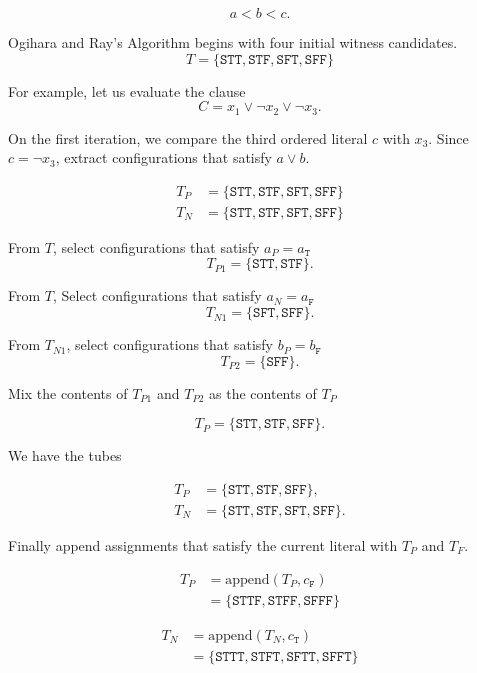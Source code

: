 \[
a < b < c.
\]


{\sc Ogihara and Ray's Algorithm} begins with four initial witness candidates. 
\[
T = \{ \texttt{STT}, \texttt{STF}, \texttt{SFT}, \texttt{SFF}\}
\]

\noindent For example, let us evaluate the clause
\[
C = x_1 \vee \neg x_2 \vee \neg x_3.
\]

\noindent On the first iteration, we compare the third ordered literal $c$ with $x_3$.  Since $c = \neg x_3$, extract configurations that satisfy $a \vee b$.  

\begin{align*}
T_P &= \{ \texttt{STT}, \texttt{STF}, \texttt{SFT}, \texttt{SFF}\} \\
T_N &= \{ \texttt{STT}, \texttt{STF}, \texttt{SFT}, \texttt{SFF}\} 
\end{align*}

\noindent From $T$, select configurations that satisfy $a_P = a_{\texttt{T}}$
\[
T_{P1} = \{ \texttt{STT}, \texttt{STF} \}.
\]

\noindent From $T$, Select configurations that satisfy $a_N = a_{\texttt{F}}$
\[
T_{N1} = \{ \texttt{SFT}, \texttt{SFF} \}.
\]

\noindent From $T_{N1}$, select configurations that satisfy $b_P = b_{\texttt{F}}$
\[
T_{P2} = \{ \texttt{SFF} \}.
\]

\noindent Mix the contents of $T_{P1}$ and $T_{P2}$ as the contents of $T_P$

\[
T_P = \{ \texttt{STT}, \texttt{STF}, \texttt{SFF} \}.
\]

\noindent We have the tubes

\begin{align*}
T_P &= \{ \texttt{STT}, \texttt{STF}, \texttt{SFF} \}, \\
T_N &= \{ \texttt{STT}, \texttt{STF}, \texttt{SFT}, \texttt{SFF}\}.
\end{align*}

\noindent Finally append assignments that satisfy the current literal with $T_P$ and $T_F$.

\begin{align*}
T_P &= \text{append}(T_P, c_{\texttt{F}}) \\
	&= \{ \texttt{STTF}, \texttt{STFF}, \texttt{SFFF} \}
\end{align*}

\begin{align*}
T_N &= \text{append}(T_N, c_{\texttt{T}}) \\
	&= \{ \texttt{STTT}, \texttt{STFT}, \texttt{SFTT}, \texttt{SFFT}\}
\end{align*}

